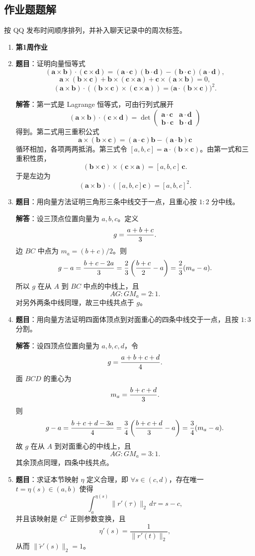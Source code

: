 \documentclass[UTF8,12pt,a4paper]{ctexart}
\newcommand{\vct}[1]{\boldsymbol{#1}}
\newcommand{\homeworkweek}[1]{%
  \item[]\vspace{0.35em}\noindent\textbf{\large #1}\vspace{0.15em}
}
\begin{document}
\subsection{作业题题解}
按 QQ 发布时间顺序排列，并补入聊天记录中的周次标签。

\begin{enumerate}
\homeworkweek{第1周作业}
\item \textbf{题目}：证明向量恒等式
\[
(\vct a\times\vct b)\cdot(\vct c\times\vct d)
=(\vct a\cdot\vct c)(\vct b\cdot\vct d)-(\vct b\cdot\vct c)(\vct a\cdot\vct d),
\]
\[
\vct a\times(\vct b\times\vct c)+\vct b\times(\vct c\times\vct a)+\vct c\times(\vct a\times\vct b)=0,
\]
\[
(\vct a\times\vct b)\cdot((\vct b\times\vct c)\times(\vct c\times\vct a))
=\bigl(\vct a\cdot(\vct b\times\vct c)\bigr)^2.
\]

\textbf{解答}：第一式是 Lagrange 恒等式，可由行列式展开
\[
(\vct a\times\vct b)\cdot(\vct c\times\vct d)
=\det\begin{pmatrix}\vct a\cdot\vct c&\vct a\cdot\vct d\\
\vct b\cdot\vct c&\vct b\cdot\vct d\end{pmatrix}
\]
得到。第二式用三重积公式
\[
\vct a\times(\vct b\times\vct c)=
(\vct a\cdot\vct c)\vct b-(\vct a\cdot\vct b)\vct c
\]
循环相加，各项两两抵消。第三式令 $[a,b,c]=\vct a\cdot(\vct b\times\vct c)$。由第一式和三重积性质，
\[
(\vct b\times\vct c)\times(\vct c\times\vct a)
=[a,b,c]\,\vct c.
\]
于是左边为
\[
(\vct a\times\vct b)\cdot([a,b,c]\vct c)
=[a,b,c]^2.
\]

\item \textbf{题目}：用向量方法证明三角形三条中线交于一点，且重心按 $1:2$ 分中线。

\textbf{解答}：设三顶点位置向量为 $a,b,c$。定义
\[
g={a+b+c\over3}.
\]
边 $BC$ 中点为 $m_a=(b+c)/2$。则
\[
g-a={b+c-2a\over3}={2\over3}\left({b+c\over2}-a\right)={2\over3}(m_a-a).
\]
所以 $g$ 在从 $A$ 到 $BC$ 中点的中线上，且
\[
AG:GM_a=2:1.
\]
对另外两条中线同理，故三中线共点于 $g$。

\item \textbf{题目}：用向量方法证明四面体顶点到对面重心的四条中线交于一点，且按 $1:3$ 分割。

\textbf{解答}：设四顶点位置向量为 $a,b,c,d$，令
\[
g={a+b+c+d\over4}.
\]
面 $BCD$ 的重心为
\[
m_a={b+c+d\over3}.
\]
则
\[
g-a={b+c+d-3a\over4}
={3\over4}\left({b+c+d\over3}-a\right)
={3\over4}(m_a-a).
\]
故 $g$ 在从 $A$ 到对面重心的中线上，且
\[
AG:GM_a=3:1.
\]
其余顶点同理，四条中线共点。

\item \textbf{题目}：求证本节映射 $\eta$ 定义合理，即 $\forall s\in(c,d)$，存在唯一
$t=\eta(s)\in(a,b)$ 使得
\[
\int_a^{\eta(s)} \|r'(\tau)\|_2\,d\tau=s-c,
\]
并且该映射是 $C^1$ 正则参数变换，且
\[
\eta'(s)=\frac{1}{\|r'(t)\|_2},
\]
从而 $\|\widetilde r'(s)\|_2=1$。


\end{enumerate}
\end{document}

